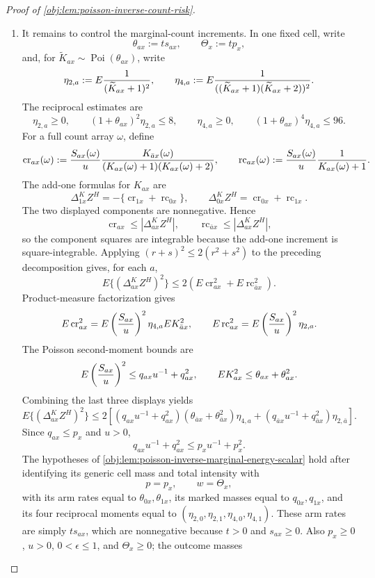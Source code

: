 \begin{proof}[Proof of \cref{obj:lem:poisson-inverse-count-risk}]
\begin{enumerate}
\item
It remains to control the marginal-count increments.  In one fixed cell, write
\[
\theta_{ax}:=ts_{ax},\qquad
\Theta_x:=tp_x,
\]
and, for \(\widetilde K_{ax}\sim\operatorname{Poi}(\theta_{ax})\), write
\[
\eta_{2,a}:=E{1\over (\widetilde K_{ax}+1)^2},\qquad
\eta_{4,a}:=E{1\over ((\widetilde K_{ax}+1)(\widetilde K_{ax}+2))^2}.
\]
The reciprocal estimates are
\[
\eta_{2,a}\ge0,
\qquad
(1+\theta_{ax})^2\eta_{2,a}\le8,
\qquad
\eta_{4,a}\ge0,
\qquad
(1+\theta_{ax})^4\eta_{4,a}\le96.
\]
For a full count array \(\omega\), define
\[
\operatorname{cr}_{ax}(\omega):=
{S_{ax}(\omega)\over u}{K_{\bar a x}(\omega)\over
(K_{ax}(\omega)+1)(K_{ax}(\omega)+2)},
\qquad
\operatorname{rc}_{ax}(\omega):=
{S_{ax}(\omega)\over u}{1\over K_{ax}(\omega)+1}.
\]
The add-one formulas for \(K_{ax}\) are
\[
\Delta^K_{1x}Z^H
=
-\{\operatorname{cr}_{1x}+\operatorname{rc}_{0x}\},
\qquad
\Delta^K_{0x}Z^H
=
\operatorname{cr}_{0x}+\operatorname{rc}_{1x}.
\]
The two displayed components are nonnegative.  Hence
\[
\operatorname{cr}_{ax}\le |\Delta^K_{ax}Z^H|,
\qquad
\operatorname{rc}_{\bar a x}\le |\Delta^K_{ax}Z^H|,
\]
so the component squares are integrable because the add-one increment is square-integrable.  Applying \((r+s)^2\le2(r^2+s^2)\) to the preceding decomposition gives, for each \(a\),
\[
E\{(\Delta^K_{ax}Z^H)^2\}
\le
2\left(E\operatorname{cr}_{ax}^2+E\operatorname{rc}_{\bar a x}^2\right).
\]
Product-measure factorization gives
\[
E\operatorname{cr}_{ax}^2
=
E\left({S_{ax}\over u}\right)^2
\eta_{4,a}
E K_{\bar a x}^2,
\qquad
E\operatorname{rc}_{ax}^2
=
E\left({S_{ax}\over u}\right)^2\eta_{2,a}.
\]
The Poisson second-moment bounds are
\[
E\left({S_{ax}\over u}\right)^2
\le q_{ax}u^{-1}+q_{ax}^2,
\qquad
E K_{ax}^2\le \theta_{ax}+\theta_{ax}^2.
\]
Combining the last three displays yields
\[
E\{(\Delta^K_{ax}Z^H)^2\}
\le
2\left[
(q_{ax}u^{-1}+q_{ax}^2)(\theta_{\bar a x}+\theta_{\bar a x}^2)\eta_{4,a}
+
(q_{\bar a x}u^{-1}+q_{\bar a x}^2)\eta_{2,\bar a}
\right].
\]
Since \(q_{ax}\le p_x\) and \(u>0\),
\[
q_{ax}u^{-1}+q_{ax}^2\le p_xu^{-1}+p_x^2.
\]
The hypotheses of \cref{obj:lem:poisson-inverse-marginal-energy-scalar} hold after identifying
its generic cell mass and total intensity with
\[
p=p_x,
\qquad
w=\Theta_x,
\]
with its arm rates equal to \(\theta_{0x},\theta_{1x}\), its marked masses equal to
\(q_{0x},q_{1x}\), and its four reciprocal moments equal to
\((\eta_{2,0},\eta_{2,1},\eta_{4,0},\eta_{4,1})\).  These arm rates are simply
\(t s_{ax}\), which are nonnegative because \(t>0\) and \(s_{ax}\ge0\).  Also
\(p_x\ge0\), \(u>0\), \(0<\epsilon\le1\), and \(\Theta_x\ge0\); the outcome masses

\end{enumerate}
\end{proof}
